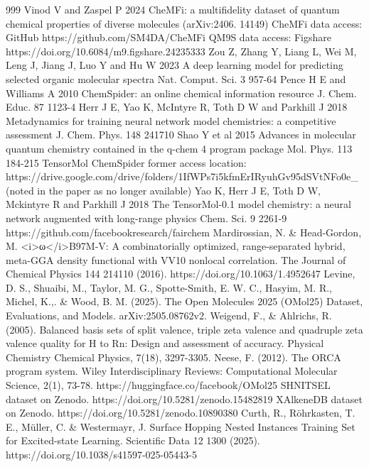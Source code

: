 \documentclass[12pt]{article}
\begin{document}
\begin{thebibliography}{999}
 Vinod V and Zaspel P 2024 CheMFi: a multifidelity dataset of quantum chemical properties of diverse molecules (arXiv:2406. 14149)
 CheMFi data access: GitHub https://github.com/SM4DA/CheMFi
 QM9S data access: Figshare https://doi.org/10.6084/m9.figshare.24235333
 Zou Z, Zhang Y, Liang L, Wei M, Leng J, Jiang J, Luo Y and Hu W 2023 A deep learning model for predicting selected organic molecular spectra Nat. Comput. Sci. 3 957-64
 Pence H E and Williams A 2010 ChemSpider: an online chemical information resource J. Chem. Educ. 87 1123-4
 Herr J E, Yao K, McIntyre R, Toth D W and Parkhill J 2018 Metadynamics for training neural network model chemistries: a competitive assessment J. Chem. Phys. 148 241710
 Shao Y et al 2015 Advances in molecular quantum chemistry contained in the q-chem 4 program package Mol. Phys. 113 184-215
 TensorMol ChemSpider former access location: https://drive.google.com/drive/folders/1IfWPs7i5kfmErIRyuhGv95dSVtNFo0e\_ (noted in the paper as no longer available)
 Yao K, Herr J E, Toth D W, Mckintyre R and Parkhill J 2018 The TensorMol-0.1 model chemistry: a neural network augmented with long-range physics Chem. Sci. 9 2261-9
 https://github.com/facebookresearch/fairchem
 Mardirossian, N. \& Head-Gordon, M. <i>ω</i>B97M-V: A combinatorially optimized, range-separated hybrid, meta-GGA density functional with VV10 nonlocal correlation. The Journal of Chemical Physics 144 214110 (2016). https://doi.org/10.1063/1.4952647
 Levine, D. S., Shuaibi, M., Taylor, M. G., Spotte-Smith, E. W. C., Hasyim, M. R., Michel, K.,. \& Wood, B. M. (2025). The Open Molecules 2025 (OMol25) Dataset, Evaluations, and Models. arXiv:2505.08762v2.
 Weigend, F., \& Ahlrichs, R. (2005). Balanced basis sets of split valence, triple zeta valence and quadruple zeta valence quality for H to Rn: Design and assessment of accuracy. Physical Chemistry Chemical Physics, 7(18), 3297-3305.
 Neese, F. (2012). The ORCA program system. Wiley Interdisciplinary Reviews: Computational Molecular Science, 2(1), 73-78.
 https://huggingface.co/facebook/OMol25
 SHNITSEL dataset on Zenodo. https://doi.org/10.5281/zenodo.15482819
 XAlkeneDB dataset on Zenodo. https://doi.org/10.5281/zenodo.10890380
 Curth, R., Röhrkasten, T. E., Müller, C. \& Westermayr, J. Surface Hopping Nested Instances Training Set for Excited-state Learning. Scientific Data 12 1300 (2025). https://doi.org/10.1038/s41597-025-05443-5

\end{thebibliography}
\end{document}
